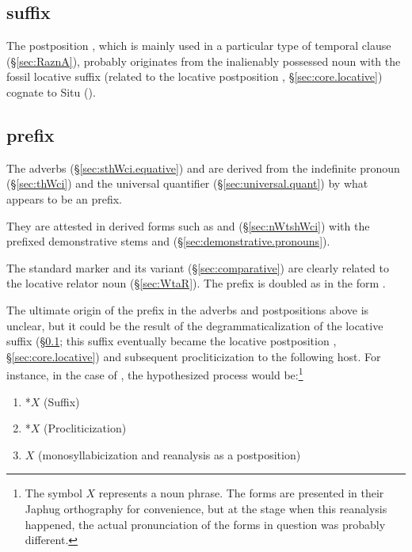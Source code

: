 \subsection{ suffix} \label{sec:denominal.postposition.s}
The postposition , which is mainly used in a particular type of temporal clause (§\ref{sec:RaznA}), probably originates from the inalienably possessed noun  with the fossil locative suffix  (related to the locative postposition , §\ref{sec:core.locative}) cognate to Situ  (\citealt[330--331]{linxr93jiarong}).

 \subsection{ prefix} \label{sec:denominal.adverb.s.prefix}
 The adverbs  (§\ref{sec:sthWci.equative}) and  are derived from the indefinite pronoun  (§\ref{sec:thWci}) and the universal quantifier  (§\ref{sec:universal.quant}) by what appears to be an  prefix. 
 
 They are attested in derived forms such as  and  (§\ref{sec:nWtshWci}) with the prefixed demonstrative stems  and  (§\ref{sec:demonstrative.pronouns}).
 
The standard marker  and its variant  (§\ref{sec:comparative}) are clearly related to the locative relator noun  (§\ref{sec:WtaR}). The prefix  is doubled as  in the form .

 The ultimate origin of the prefix  in the adverbs and postpositions above is unclear, but it could be the result of the degrammaticalization of the locative  suffix (§\ref{sec:denominal.postposition.s}; this suffix eventually became the locative postposition , §\ref {sec:core.locative}) and subsequent procliticization to the following host. For instance, in the case of , the hypothesized process would be:\footnote{The symbol $X$ represents a noun phrase. The forms are presented in their Japhug orthography for convenience, but at the stage when this reanalysis happened, the actual pronunciation of the forms in question was probably different. }
 
 \begin{enumerate}
\item *$X$ (Suffix)
\item *$X$ (Procliticization)
\item $X$  (monosyllabicization and reanalysis as a postposition) 
\end{enumerate}
 
 
